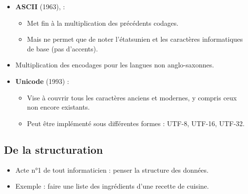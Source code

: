 \begin{slide}
  \begin{itemize}
    \item \textbf{ASCII} (1963), :
      \begin{itemize}
	\item Met fin à la multiplication des précédents codages.
	\item Mais ne permet que de noter l'étatsunien et les caractères informatiques de base (pas d'accents).
      \end{itemize}
    \item Multiplication des encodages pour les langues non anglo-saxonnes.
    \item \textbf{Unicode} (1993) : 
      \begin{itemize}
	\item Vise à couvrir tous les caractères anciens et modernes, y compris ceux non encore existants.
	\item Peut être implémenté sous différentes formes  : UTF-8, UTF-16, UTF-32.
      \end{itemize}
  \end{itemize}
\end{slide}

\subsection{De la structuration}
\begin{slide}
  \begin{itemize}
    \item Acte n°1 de tout informaticien : penser la structure des données.
    \item Exemple : faire une liste des ingrédients d'une recette de cuisine.
  \end{itemize}
\end{slide}


